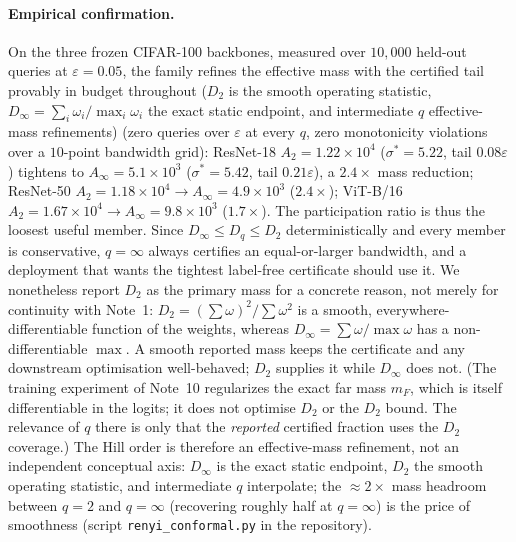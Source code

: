 \documentclass[10pt,twocolumn]{article}
\newcommand{\sstar}{\sigma^{*}}
\begin{document}
\paragraph{Empirical confirmation.} On the three frozen CIFAR-100 backbones, measured over $10{,}000$ held-out queries at $\varepsilon=0.05$, the family refines the effective mass with the certified tail provably in budget throughout ($D_2$ is the smooth operating statistic, $D_\infty=\sum_i\omega_i/\max_i\omega_i$ the exact static endpoint, and intermediate $q$ effective-mass refinements) (zero queries over $\varepsilon$ at every $q$, zero monotonicity violations over a $10$-point bandwidth grid):
ResNet-18 $A_2=1.22\times10^4$ ($\sstar=5.22$, tail $0.08\varepsilon$) tightens to $A_\infty=5.1\times10^3$ ($\sstar=5.42$, tail $0.21\varepsilon$), a $2.4\times$ mass reduction;
ResNet-50 $A_2=1.18\times10^4\to A_\infty=4.9\times10^3$ ($2.4\times$);
ViT-B/16 $A_2=1.67\times10^4\to A_\infty=9.8\times10^3$ ($1.7\times$). The participation ratio is thus the loosest useful member. Since $D_\infty\le D_q\le D_2$ deterministically and every member is conservative, $q=\infty$ always certifies an equal-or-larger bandwidth, and a deployment that wants the tightest label-free certificate should use it. We nonetheless report $D_2$ as the primary mass for a concrete reason, not merely for continuity with Note~1: $D_2=(\sum\omega)^2/\sum\omega^2$ is a smooth, everywhere-differentiable function of the weights, whereas $D_\infty=\sum\omega/\max\omega$ has a non-differentiable $\max$. A smooth reported mass keeps the certificate and any downstream optimisation well-behaved; $D_2$ supplies it while $D_\infty$ does not. (The training experiment of Note~10 regularizes the exact far mass $m_F$, which is itself differentiable in the logits; it does not optimise $D_2$ or the $D_2$ bound. The relevance of $q$ there is only that the \emph{reported} certified fraction uses the $D_2$ coverage.) The Hill order is therefore an effective-mass refinement, not an independent conceptual axis: $D_\infty$ is the exact static endpoint, $D_2$ the smooth operating statistic, and intermediate $q$ interpolate; the $\approx\!2\times$ mass headroom between $q=2$ and $q=\infty$ (recovering roughly half at $q=\infty$) is the price of smoothness (script \texttt{renyi\_conformal.py} in the repository).
\end{document}
